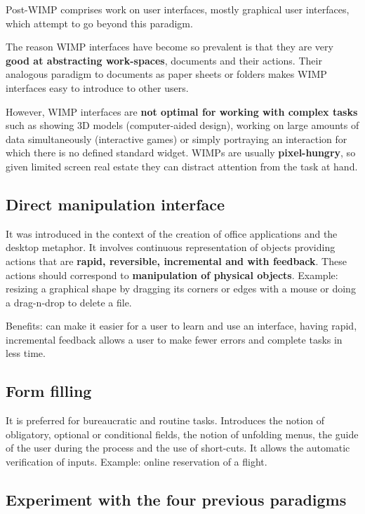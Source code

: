 Post-WIMP comprises work on user interfaces, mostly graphical user interfaces, which attempt to go beyond this paradigm.

The reason WIMP interfaces have become so prevalent is that they are very \textbf{good at abstracting work-spaces}, documents and their actions. Their analogous paradigm to documents as paper sheets or folders makes WIMP interfaces easy to introduce to other users. 

However, WIMP interfaces are \textbf{not optimal for working with complex tasks} such as showing 3D models (computer-aided design), working on large amounts of data simultaneously (interactive games) or simply portraying an interaction for which there is no defined standard widget. WIMPs are usually \textbf{pixel-hungry}, so given limited screen real estate they can distract attention from the task at hand.  

\subsection{Direct manipulation interface}

It was introduced in the context of the creation of office applications and the desktop metaphor. It involves continuous representation of objects providing actions that are \textbf{rapid, reversible, incremental and with feedback}. These actions should correspond to \textbf{manipulation of physical objects}. Example: resizing a graphical shape by dragging its corners or edges with a mouse or doing a drag-n-drop to delete a file.

Benefits: can make it easier for a user to learn and use an interface, having rapid, incremental feedback allows a user to make fewer errors and complete tasks in less time.

\subsection{Form filling}

It is preferred for bureaucratic and routine tasks. Introduces the notion of obligatory, optional or conditional fields, the notion of unfolding menus, the guide of the user during the process and the use of short-cuts. It allows the automatic verification of inputs. Example: online reservation of a flight. 

\subsection{Experiment with the four previous paradigms}

